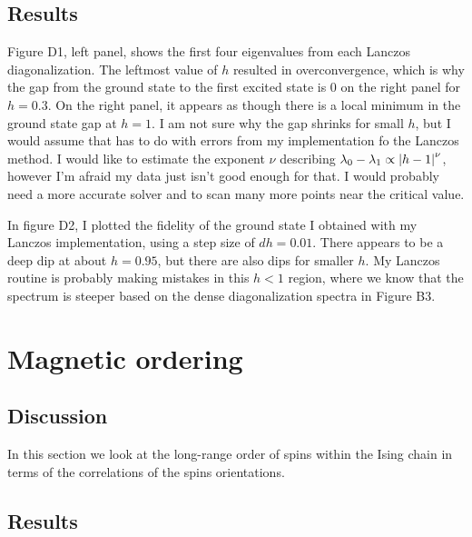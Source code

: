 \documentclass{article}
\begin{document}
\subsection{
Results
}

{\centering



}


{\centering



}

Figure D1, left panel, shows the first four eigenvalues
from each Lanczos diagonalization.
The leftmost value of $h$ resulted in overconvergence, which
is why the gap from the ground state to the first excited state is
0 on the right panel for $h=0.3$.
On the right panel, it appears as though there is a local minimum
in the ground state gap at $h=1$.
I am not sure why the gap shrinks for small $h$, but I would assume
that has to do with errors from my implementation fo the Lanczos method.
I would like to estimate the exponent $\nu$ describing
$\lambda_0 - \lambda_1 \propto \abs{h-1}^\nu$, however I'm afraid my data
just isn't good enough for that.
I would probably need a more accurate solver and to scan many more points
near the critical value.

In figure D2, I plotted the fidelity of the ground state I obtained with
my Lanczos implementation, using a step size of $dh=0.01$.
There appears to be a deep dip at about $h=0.95$, but there are also
dips for smaller $h$.
My Lanczos routine is probably making mistakes in this $h<1$ region, where
we know that the spectrum is steeper based on the dense diagonalization
spectra in Figure B3.

\newpage

\section{
Magnetic ordering
}


\subsection{
Discussion
}

In this section we look at the long-range order
of spins within the Ising chain in terms of the
correlations of the spins orientations.

\subsection{
Results
}
\end{document}
